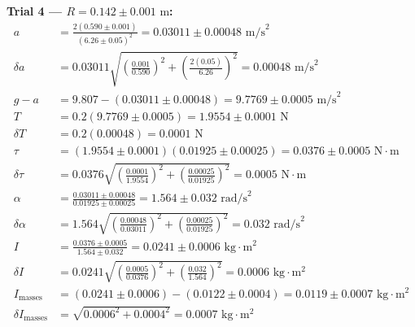 \documentclass[11pt]{article}
\begin{document}
\textbf{Trial 4 — $R = 0.142 \pm 0.001\text{ m}$:}
\begin{align*}
a &= \frac{2(0.590 \pm 0.001)}{(6.26 \pm 0.05)^2} = 0.03011 \pm 0.00048\text{ m/s}^2 \\
\delta a &= 0.03011\sqrt{\left(\frac{0.001}{0.590}\right)^2 + \left(\frac{2(0.05)}{6.26}\right)^2} = 0.00048\text{ m/s}^2 \\
g - a &= 9.807 - (0.03011 \pm 0.00048) = 9.7769 \pm 0.0005\text{ m/s}^2 \\
T &= 0.2(9.7769 \pm 0.0005) = 1.9554 \pm 0.0001\text{ N} \\
\delta T &= 0.2(0.00048) = 0.0001\text{ N} \\
\tau &= (1.9554 \pm 0.0001)(0.01925 \pm 0.00025) = 0.0376 \pm 0.0005\text{ N}\cdot\text{m} \\
\delta\tau &= 0.0376\sqrt{\left(\frac{0.0001}{1.9554}\right)^2 + \left(\frac{0.00025}{0.01925}\right)^2} = 0.0005\text{ N}\cdot\text{m} \\
\alpha &= \frac{0.03011 \pm 0.00048}{0.01925 \pm 0.00025} = 1.564 \pm 0.032\text{ rad/s}^2 \\
\delta\alpha &= 1.564\sqrt{\left(\frac{0.00048}{0.03011}\right)^2 + \left(\frac{0.00025}{0.01925}\right)^2} = 0.032\text{ rad/s}^2 \\
I &= \frac{0.0376 \pm 0.0005}{1.564 \pm 0.032} = 0.0241 \pm 0.0006\text{ kg}\cdot\text{m}^2 \\
\delta I &= 0.0241\sqrt{\left(\frac{0.0005}{0.0376}\right)^2 + \left(\frac{0.032}{1.564}\right)^2} = 0.0006\text{ kg}\cdot\text{m}^2 \\
I_{\text{masses}} &= (0.0241 \pm 0.0006) - (0.0122 \pm 0.0004) = 0.0119 \pm 0.0007\text{ kg}\cdot\text{m}^2 \\
\delta I_{\text{masses}} &= \sqrt{0.0006^2 + 0.0004^2} = 0.0007\text{ kg}\cdot\text{m}^2
\end{align*}
\end{document}
